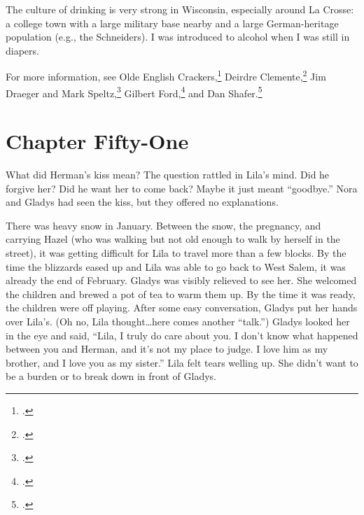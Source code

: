 \documentclass[
  american,
  letterpaper,
]{book}
\begin{document}
The culture of drinking is very strong in Wisconsin, especially around
La Crosse: a college town with a large military base nearby and a large
German-heritage population (e.g., the Schneiders). I was introduced to
alcohol when I was still in diapers.

For more information, see Olde English Crackers,\footnote{.}
Deirdre Clemente,\footnote{.} Jim Draeger and Mark
Speltz,\footnote{.} Gilbert Ford,\footnote{.} and Dan Shafer.\footnote{.}


\chapter{Chapter Fifty-One}\label{chapter-fifty-one}

What did Herman's kiss mean? The question rattled in Lila's mind. Did he
forgive her? Did he want her to come back? Maybe it just meant
``goodbye.'' Nora and Gladys had seen the kiss, but they offered no
explanations.

There was heavy snow in January. Between the snow, the pregnancy, and
carrying Hazel (who was walking but not old enough to walk by herself in
the street), it was getting difficult for Lila to travel more than a few
blocks. By the time the blizzards eased up and Lila was able to go back
to West Salem, it was already the end of February. Gladys was visibly
relieved to see her. She welcomed the children and brewed a pot of tea
to warm them up. By the time it was ready, the children were off
playing. After some easy conversation, Gladys put her hands over Lila's.
(Oh no, Lila thought\ldots here comes another ``talk.'') Gladys looked
her in the eye and said, ``Lila, I truly do care about you. I don't know
what happened between you and Herman, and it's not my place to judge. I
love him as my brother, and I love you as my sister.'' Lila felt tears
welling up. She didn't want to be a burden or to break down in front of
Gladys.
\end{document}
